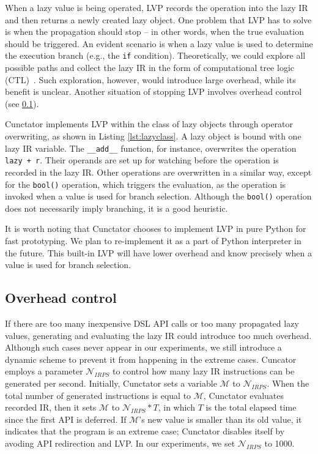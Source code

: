 \documentclass[sigconf]{acmart}\settopmatter{printfolios=true,printccs=false,printacmref=false}\setcopyright{none}
\newcommand {\REV}[1]{#1}
\begin{document}
When a lazy value is being operated, LVP records the operation into the lazy IR and then returns a newly created lazy object. One problem that LVP has to solve is when the propagation should stop -- in other words, when the true evaluation should be triggered. An evident scenario is when a lazy value is used to determine the execution branch (e.g., the \texttt{if} condition). Theoretically, we could explore all possible paths and collect the lazy IR in the form of computational tree logic (CTL)~\cite{Clarke:1981}. Such exploration, however, would introduce large overhead, while its benefit is unclear. Another situation of stopping LVP involves overhead control (see \cref{sec:overheadc}).



Cunctator implements LVP within the class of lazy objects through operator overwriting, as shown in Listing \ref{lst:lazyclass}. A lazy object is bound with one lazy IR variable. The \texttt{\_\_add\_\_} function, for instance, overwrites the operation \texttt{lazy + r}. Their operands are set up for watching before the operation is recorded in the lazy IR. Other operations are overwritten in a similar way, except for the \texttt{bool()} operation, which triggers the evaluation, as the operation is invoked when a value is used for branch selection. Although the \texttt{bool()} operation does not necessarily imply branching, it is a good heuristic.

It is worth noting that Cunctator chooses to implement LVP in pure Python for fast prototyping. We plan to re-implement it as a part of Python interpreter in the future. \REV{This built-in LVP will have lower overhead and know precisely when a value is used for branch selection.}

\subsection{Overhead control}
\label{sec:overheadc}

If there are too many inexpensive DSL API calls or too many propagated lazy values, generating and evaluating the lazy IR could introduce too much overhead. Although such cases never appear in our experiments, we still introduce a dynamic scheme to prevent it from happening in the extreme cases. Cuncator employs a parameter $\mathcal{N}_{IRPS}$ to control how many lazy IR instructions can be generated per second. Initially, Cunctator sets a variable $\mathcal{M}$ to $\mathcal{N}_{IRPS}$. When the total number of generated instructions is equal to $\mathcal{M}$, Cunctator evaluates recorded IR, then it sets $\mathcal{M}$ to $\mathcal{N}_{IRPS} * T$, in which $T$ is the total elapsed time since the first API is deferred. If $\mathcal{M}$'s new value is smaller than its old value, it indicates that the program is an extreme case; Cunctator disables itself by avoding API redirection and LVP. In our experiments, we set $\mathcal{N}_{IRPS}$ to 1000. 
\end{document}
